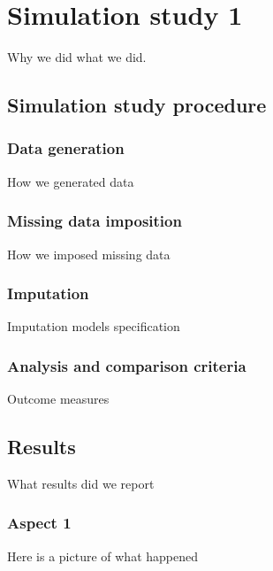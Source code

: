 \documentclass[a4paper,man,floatsintext,natbib]{apa6}\usepackage[]{graphicx}\usepackage[]{xcolor}
\begin{document}
\section{Simulation study 1}

	Why we did what we did.

\subsection{Simulation study procedure}

\subsubsection{Data generation}

	How we generated data	

\subsubsection{Missing data imposition}\label{sub-missing}

	How we imposed missing data	

\subsubsection{Imputation}

	Imputation models specification

\subsubsection{Analysis and comparison criteria}\label{criteria}

	Outcome measures

\subsection{Results}
	
	What results did we report



\subsubsection{Aspect 1}

	Here is a picture of what happened
\end{document}
